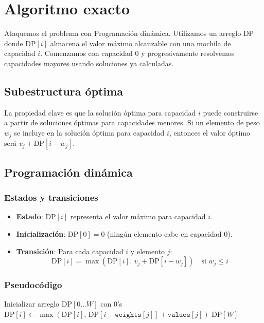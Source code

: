 \documentclass{report}
\begin{document}
\section{Algoritmo exacto}

Ataquemos el problema con Programación dinámica.
Utilizamos un arreglo $\text{DP}$ donde $\text{DP}[i]$ almacena el valor máximo alcanzable con una mochila de capacidad $i$. Comenzamos con capacidad 0 y progresivamente resolvemos capacidades mayores usando soluciones ya calculadas.

\subsection*{Subestructura óptima}
La propiedad clave es que la solución óptima para capacidad $i$ puede construirse a partir de soluciones óptimas para capacidades menores. Si un elemento de peso $w_j$ se incluye en la solución óptima para capacidad $i$, entonces el valor óptimo será $v_j + \text{DP}[i - w_j]$.

\subsection{Programación dinámica}
\subsubsection*{Estados y transiciones}
\begin{itemize}
    \item \textbf{Estado}: $\text{DP}[i]$ representa el valor máximo para capacidad $i$.
    \item \textbf{Inicialización}: $\text{DP}[0] = 0$ (ningún elemento cabe en capacidad 0).
    \item \textbf{Transición}: Para cada capacidad $i$ y elemento $j$:
        \[
        \text{DP}[i] = \max\left(\text{DP}[i],\, v_j + \text{DP}[i - w_j]\right) \quad \text{si } w_j \leq i
        \]
\end{itemize}

\subsubsection*{Pseudocódigo}
\begin{algorithmic}[1]
    \State Inicializar arreglo $\text{DP}[0 \dots W]$ con 0's
                \State $\text{DP}[i] \gets \max(\text{DP}[i],\, \text{DP}[i - \texttt{weights}[j]] + \texttt{values}[j])$
            \EndIf
        \EndFor
    \EndFor
    \State \Return $\text{DP}[W]$
\EndProcedure
\end{algorithmic}
\end{document}
